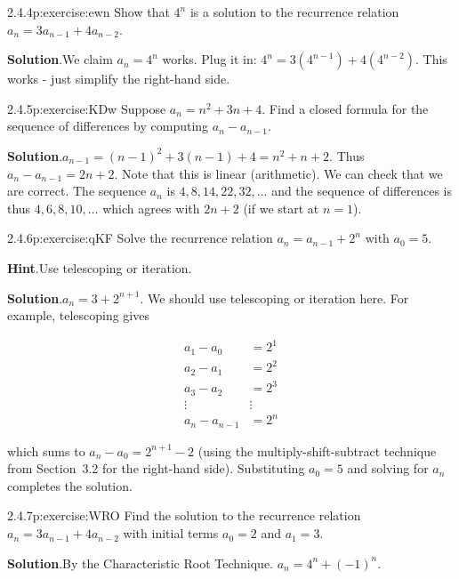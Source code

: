 \documentclass[twoside,11pt,]{book}
\newcommand{\blocktitlefont}{\relax}
\numberwithin{equation}{chapter}
\newcommand{\amp}{&}
\begin{document}
\begin{divisionsolution}{2.4.4}{}{p:exercise:ewn}%
Show that \(4^n\) is a solution to the recurrence relation \(a_n = 3a_{n-1} + 4a_{n-2}\).%
\par\smallskip%
\noindent\textbf{\blocktitlefont Solution}.\quad{}We claim \(a_n = 4^n\) works. Plug it in: \(4^n = 3(4^{n-1}) + 4(4^{n-2})\). This works - just simplify the right-hand side.%
\end{divisionsolution}%
\begin{divisionsolution}{2.4.5}{}{p:exercise:KDw}%
Suppose \(a_n = n^2 + 3n + 4\text{.}\) Find a closed formula for the sequence of differences by computing \(a_n - a_{n-1}\text{.}\)%
\par\smallskip%
\noindent\textbf{\blocktitlefont Solution}.\quad{}\(a_{n-1} = (n-1)^2 + 3(n-1) + 4 = n^2 + n + 2\text{.}\) Thus \(a_n - a_{n-1} = 2n+2\text{.}\) Note that this is linear (arithmetic). We can check that we are correct. The sequence \(a_n\) is \(4, 8, 14, 22, 32, \ldots\) and the sequence of differences is thus \(4, 6, 8, 10,\ldots\) which agrees with \(2n+2\) (if we start at \(n = 1\)).%
\end{divisionsolution}%
\begin{divisionsolution}{2.4.6}{}{p:exercise:qKF}%
Solve the recurrence relation \(a_n = a_{n-1} + 2^n\) with \(a_0 = 5\text{.}\)%
\par\smallskip%
\noindent\textbf{\blocktitlefont Hint}.\quad{}Use telescoping or iteration.%
\par\smallskip%
\noindent\textbf{\blocktitlefont Solution}.\quad{}\(a_n = 3 + 2^{n+1}\text{.}\) We should use telescoping or iteration here. For example, telescoping gives%
\par
%
\begin{equation*}
\begin{aligned}
a_1 - a_0 \amp = 2^1\\
a_2 - a_1 \amp = 2^2\\
a_3 - a_2 \amp = 2^3\\
\vdots\amp \vdots\\
a_n - a_{n-1} \amp = 2^n
\end{aligned}
\end{equation*}
%
\par
which sums to \(a_n - a_0 = 2^{n+1} - 2\) (using the multiply-shift-subtract technique from Section~3.2 for the right-hand side). Substituting \(a_0 = 5\) and solving for \(a_n\) completes the solution.%
\end{divisionsolution}%
\begin{divisionsolution}{2.4.7}{}{p:exercise:WRO}%
Find the solution to the recurrence relation \(a_n = 3a_{n-1} + 4a_{n-2}\) with initial terms \(a_0 = 2\) and \(a_1 = 3\text{.}\)%
\par\smallskip%
\noindent\textbf{\blocktitlefont Solution}.\quad{}By the Characteristic Root Technique. \(a_n = 4^n + (-1)^n\text{.}\)%
\end{divisionsolution}%
\end{document}
